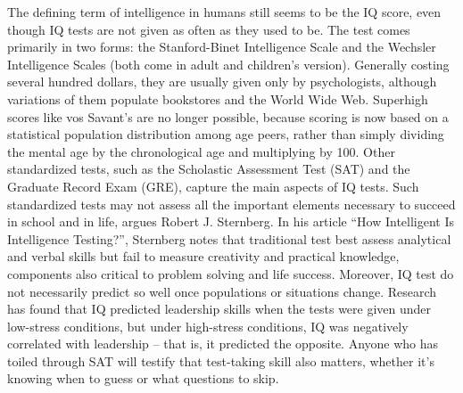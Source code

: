 The defining term of intelligence in humans still seems to be the IQ score, even though IQ tests are not given as often as they used to be. The test comes primarily in two forms: the Stanford-Binet Intelligence Scale and the Wechsler Intelligence Scales (both come in adult and children’s version). Generally costing several hundred dollars, they are usually given only by psychologists, although variations of them populate bookstores and the World Wide Web. Superhigh scores like vos Savant’s are no longer possible, because scoring is now based on a statistical population distribution among age peers, rather than simply dividing the mental age by the chronological age and multiplying by 100. Other standardized tests, such as the Scholastic Assessment Test (SAT) and the Graduate Record Exam (GRE), capture the main aspects of IQ tests.
Such standardized tests may not assess all the important elements necessary to succeed in school and in life, argues Robert J. Sternberg. In his article “How Intelligent Is Intelligence Testing?”, Sternberg notes that traditional test best assess analytical and verbal skills but fail to measure creativity and practical knowledge, components also critical to problem solving and life success. Moreover, IQ test do not necessarily predict so well once populations or situations change. Research has found that IQ predicted leadership skills when the tests were given under low-stress conditions, but under high-stress conditions, IQ was negatively correlated with leadership – that is, it predicted the opposite. Anyone who has toiled through SAT will testify that test-taking skill also matters, whether it’s knowing when to guess or what questions to skip.
